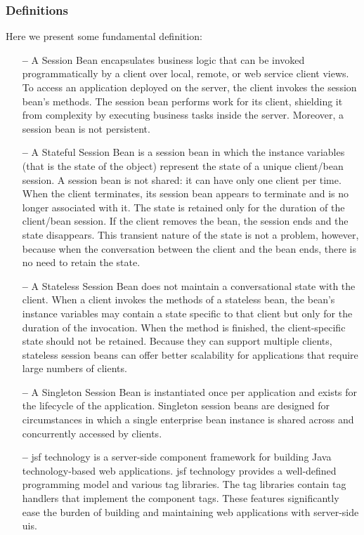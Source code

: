 \subsubsection{Definitions} \label{def}
Here we present some fundamental definition:
\begin{itemize}
\item[\textbf{--}] A \textsf{Session Bean} encapsulates business logic that can be invoked programmatically by a client over local, remote, or web service client views. To access an application deployed on the server, the client invokes the session bean's methods. The session bean performs work for its client, shielding it from complexity by executing business tasks inside the server. Moreover, a session bean is not persistent. 

\item[\textbf{--}] A \textsf{Stateful Session Bean} is a session bean in which the instance variables (that is the state of the object) represent the state of a unique client/bean session.
A session bean is not shared: it can have only one client per time. When the client terminates, its session bean appears to terminate and is no longer associated with it.
The state is retained only for the duration of the client/bean session. If the client removes the bean, the session ends and the state disappears. This transient nature of the state is not a problem, however, because when the conversation between the client and the bean ends, there is no need to retain the state.

\item[\textbf{--}] A \textsf{Stateless Session Bean} does not maintain a conversational state with the client. When a client invokes the methods of a stateless bean, the bean's instance variables may contain a state specific to that client but only for the duration of the invocation. When the method is finished, the client-specific state should not be retained. 
Because they can support multiple clients, stateless session beans can offer better scalability for applications that require large numbers of clients.

\item[\textbf{--}] A \textsf{Singleton Session Bean} is instantiated once per application and exists for the lifecycle of the application. Singleton session beans are designed for circumstances in which a single enterprise bean instance is shared across and concurrently accessed by clients.

\item[\textbf{--}] \textsf{\acl{jsf}} technology is a server-side component framework for building Java technology-based web applications.
\acs{jsf} technology provides a well-defined programming model and various tag libraries. The tag libraries contain tag handlers that implement the component tags. These features significantly ease the burden of building and maintaining web applications with server-side \acs{ui}s.

\end{itemize}

